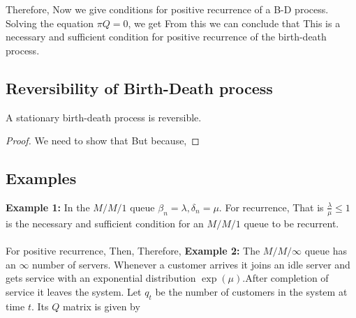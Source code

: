 \documentclass[all-lectures.tex]{subfiles}
\begin{document}
Therefore,
Now we give conditions for positive recurrence of a B-D process.
Solving the equation $\pi Q = 0$, we get
From this we can conclude that
This is a necessary and sufficient condition for positive recurrence of the birth-death process.

\subsection{Reversibility of Birth-Death process}
\begin{prop}
A stationary birth-death process is reversible.
\end{prop}

\begin{proof}
We need to show that 
But
because, 
\end{proof}
\subsection{Examples}
\textbf{Example 1:} In the $M/M/1$ queue $\beta_n = \lambda, \delta_n = \mu$. For recurrence,
That is $\frac{\lambda}{\mu}  \le 1$ is the necessary and sufficient condition for an $M/M/1$ queue to be recurrent.\\\\
For positive recurrence,
Then,
Therefore,
\textbf{Example 2:} 	The $M/M/\infty$ queue has an $\infty$ number of servers. Whenever a customer arrives it joins an idle server and gets service with an exponential distribution $\exp(\mu)$.After completion of service it leaves the system. 
Let $q_t$ be the number of customers in the system at time $t$.
Its $Q$ matrix is given by
\end{document}
